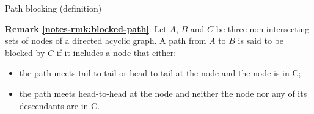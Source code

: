 \documentclass{beamer}
\newcommand{\remark}[2]{\noindent\colorbox{red!10}{\parbox{0.995\textwidth}{\textbf{Remark \ref{notes-rmk:#1}}: #2}}\\}
\begin{document}
\begin{frame}{Path blocking (definition)}
\remark{blocked-path}{\small Let $A$, $B$ and $C$ be three non-intersecting sets of nodes of a directed acyclic graph. A path from $A$ to $B$ is said to be blocked by $C$ if it includes a node that either:
\begin{itemize}
\item the path meets tail-to-tail or head-to-tail at the node and the node is in C;
\item the path meets head-to-head at the node and neither the node nor any of its descendants are in C.
\end{itemize}}\vspace{3mm}\pause
  \begin{columns}
   \begin{column}{0.25\textwidth}

\end{column}
\end{columns}
\end{frame}
\end{document}
